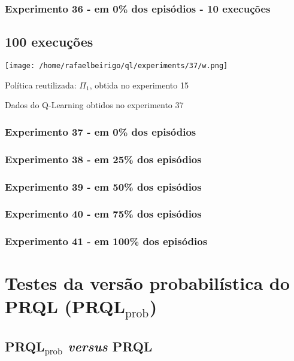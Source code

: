 \documentclass[11pt]{article}
\begin{document}
\subsubsection{Experimento 36 - em   0\% dos episódios - 10 execuções}
\label{sec-10.1.5}


\subsection{100 execuções}
\label{sec-10.2}

\centerline{\texttt{[image: /home/rafaelbeirigo/ql/experiments/37/w.png]}}


Política reutilizada: $\Pi$$_1$, obtida no experimento 15

Dados do Q-Learning obtidos no experimento 37

\subsubsection{Experimento 37 - em   0\% dos episódios}
\label{sec-10.2.1}

\subsubsection{Experimento 38 - em  25\% dos episódios}
\label{sec-10.2.2}

\subsubsection{Experimento 39 - em  50\% dos episódios}
\label{sec-10.2.3}

\subsubsection{Experimento 40 - em  75\% dos episódios}
\label{sec-10.2.4}

\subsubsection{Experimento 41 - em 100\% dos episódios}
\label{sec-10.2.5}



\section{Testes da versão probabilística do PRQL (PRQL$_{\mathrm{prob}}$)}
\label{sec-11}

\subsection{PRQL$_{\mathrm{prob}}$ \emph{versus} PRQL}
\label{sec-11.1}
\end{document}

